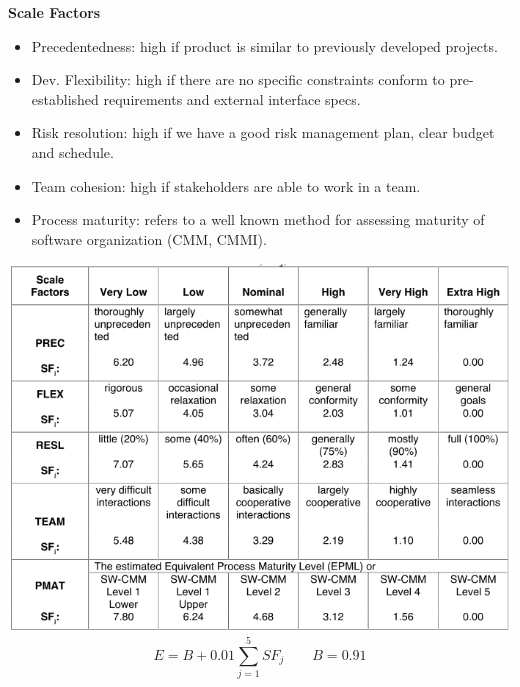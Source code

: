 \textbf{Scale Factors}\\
\begin{itemize}
    \item Precedentedness: high if product is similar to previously developed projects.
    \item Dev. Flexibility: high if there are no specific constraints conform to pre-established requirements and external interface specs.
    \item Risk resolution: high if we have a good risk management plan, clear budget and schedule.
    \item Team cohesion: high if stakeholders are able to work in a team.
    \item Process maturity: refers to a well known method for assessing maturity of software organization (CMM, CMMI).
\end{itemize}
\includegraphics[angle=90,origin=c,width=\linewidth]{8-project-management/scale-factors.png}
\[ E = B + 0.01 \sum_{j=1}^{5} SF_j \qquad B = 0.91 \]

